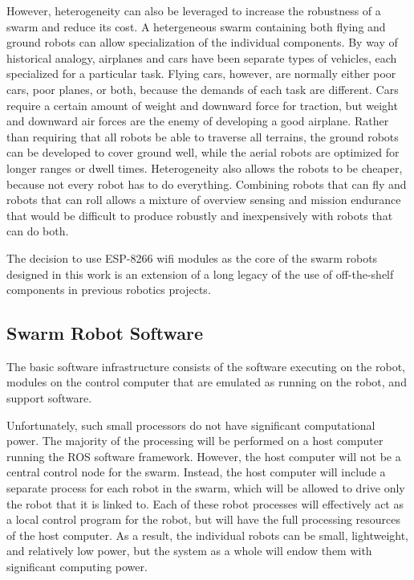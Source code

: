 \documentclass[]{article}
\begin{document}
However, heterogeneity can also be leveraged to increase the robustness of a swarm and reduce its cost. 
A hetergeneous swarm containing both flying and ground robots can allow specialization of the individual components. 
By way of historical analogy, airplanes and cars have been separate types of vehicles, each specialized for a particular task. 
Flying cars, however, are normally either poor cars, poor planes, or both, because the demands of each task are different. 
Cars require a certain amount of weight and downward force for traction, but weight and downward air forces are the enemy of developing a good airplane. 
Rather than requiring that all robots be able to traverse all terrains, the ground robots can be developed to cover ground well, while the aerial robots are optimized for longer ranges or dwell times. 
Heterogeneity also allows the robots to be cheaper, because not every robot has to do everything.
Combining robots that can fly and robots that can roll allows a mixture of overview sensing and mission endurance that would be difficult to produce robustly and inexpensively with robots that can do both. 

The decision to use ESP-8266 wifi modules as the core of the swarm robots designed in this work is an extension of a long legacy of the use of off-the-shelf components in previous robotics projects. 

\subsection{Swarm Robot Software}

The basic software infrastructure consists of the software executing on the robot, modules on the control computer that are emulated as running on the robot, and support software. 

Unfortunately, such small processors do not have significant computational power. 
The majority of the processing will be performed on a host computer running the ROS software framework. 
However, the host computer will not be a central control node for the swarm. 
Instead, the host computer will include a separate process for each robot in the swarm, which will be allowed to drive only the robot that it is linked to. 
Each of these robot processes will effectively act as a local control program for the robot, but will have the full processing resources of the host computer. 
As a result, the individual robots can be small, lightweight, and relatively low power, but the system as a whole will endow them with significant computing power. 
\end{document}
